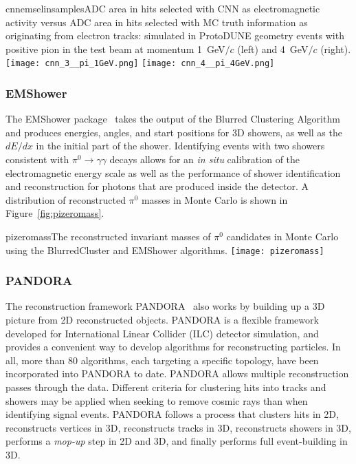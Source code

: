 \begin{cdrfigure}{cnnemselinsamples}{ADC area
in hits selected with CNN as electromagnetic activity versus ADC area in hits selected
with MC truth information as originating from electron tracks: simulated in ProtoDUNE
geometry events with positive pion in the test beam at momentum 1~GeV$/c$ (left) and
4~GeV$/c$ (right).}
\texttt{[image: cnn\_3\_\_pi\_1GeV.png]}
\texttt{[image: cnn\_4\_\_pi\_4GeV.png]}
\end{cdrfigure}


\subsubsection{EMShower}

The EMShower package~\cite{emshowerpackage} takes the output of the
Blurred Clustering Algorithm and
produces energies, angles, and start positions for 3D showers, as
well as the $dE/dx$ in the initial part of the shower.  Identifying
events with two showers consistent with $\pi^0\rightarrow\gamma\gamma$
decays allows for an \textit{in situ} calibration of the electromagnetic
energy scale as well as the performance of shower identification and
reconstruction for photons that are produced inside the detector.  A
distribution of reconstructed $\pi^0$ masses in Monte Carlo is shown
in Figure~\ref{fig:pizeromass}.

\begin{cdrfigure}{pizeromass}{The reconstructed invariant masses of $\pi^0$ candidates in
  Monte Carlo using the BlurredCluster and EMShower algorithms.}
\texttt{[image: pizeromass]}
\end{cdrfigure}

\subsubsection{PANDORA}

The reconstruction framework PANDORA~\cite{Marshall:2015rfa} also works by
building up a 3D picture from 2D
reconstructed objects.  PANDORA is a flexible framework developed for
International Linear Collider (ILC) detector simulation, and provides a convenient way to develop
algorithms for reconstructing particles.  In all, more than 80
algorithms, each targeting a specific topology, have been incorporated
into PANDORA to date.  PANDORA allows multiple reconstruction passes through the data.  
Different criteria for clustering hits into tracks and
showers may be applied when seeking to remove cosmic rays %
than when
identifying signal events.  PANDORA follows a process that clusters hits in 2D,
reconstructs vertices in 3D, reconstructs tracks in 3D,
reconstructs showers in 3D, performs a \textit{mop-up} step in 2D and 3D, and finally performs
full event-building in 3D.


